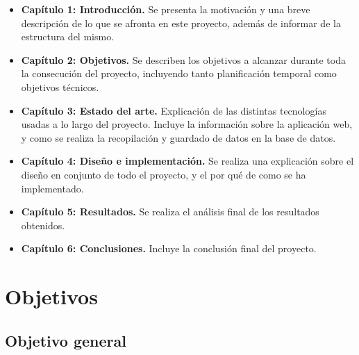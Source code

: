 \documentclass[a4paper, 12pt]{book}
\begin{document}
\begin{itemize}
  \item \textbf{Capítulo 1: Introducción.} Se presenta la motivación y una breve descripción de lo que se afronta en este proyecto, además de informar de la estructura del mismo.
  
  \item \textbf{Capítulo 2: Objetivos.} Se describen los objetivos a alcanzar durante toda la consecución del proyecto, incluyendo tanto planificación temporal como objetivos técnicos.
  
  \item \textbf{Capítulo 3: Estado del arte.} Explicación de las distintas tecnologías usadas a lo largo del proyecto. Incluye la información sobre la aplicación web, y como se realiza la recopilación y guardado de datos en la base de datos.
  
  \item \textbf{Capítulo 4: Diseño e implementación.} Se realiza una explicación sobre el diseño en conjunto de todo el proyecto, y el por qué de como se ha implementado.
  
  \item \textbf{Capítulo 5: Resultados.} Se realiza el análisis final de los resultados obtenidos.
  
  \item \textbf{Capítulo 6: Conclusiones.} Incluye la conclusión final del proyecto.

\end{itemize}






\cleardoublepage %
\chapter{Objetivos} %
\label{chap:objetivos} %

\section{Objetivo general} %
\label{sec:objetivo-general} %
\end{document}
